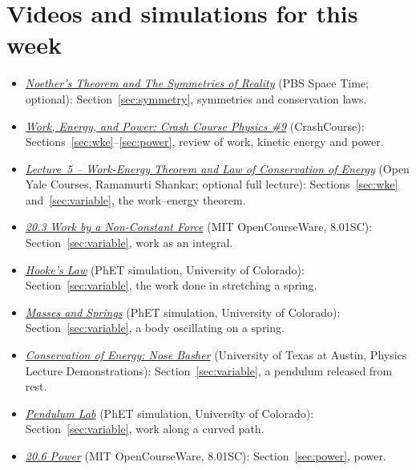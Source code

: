 \documentclass[11pt,a4paper]{article}
\begin{document}
\section*{Videos and simulations for this week}
\begin{itemize}[nosep]
\item \href{https://www.pbs.org/video/noethers-theorem-and-the-symmetries-of-reality-tf9sqz}{\emph{Noether's
  Theorem and The Symmetries of Reality}} (PBS Space Time; optional): Section~\ref{sec:symmetry},
  symmetries and conservation laws.
\item \href{https://www.youtube.com/watch?v=w4QFJb9a8vo}{\emph{Work, Energy, and Power: Crash
  Course Physics \#9}} (CrashCourse): Sections~\ref{sec:wke}--\ref{sec:power}, review of work,
  kinetic energy and power.
\item \href{https://oyc.yale.edu/node/1555}{\emph{Lecture~5 -- Work-Energy Theorem and Law of
  Conservation of Energy}} (Open Yale Courses, Ramamurti Shankar; optional full lecture):
  Sections~\ref{sec:wke} and~\ref{sec:variable}, the work--energy theorem.
\item \href{https://ocw.mit.edu/courses/8-01sc-classical-mechanics-fall-2016/pages/week-7-kinetic-energy-and-work/20-3-work-by-a-non-constant-force/}{\emph{20.3
  Work by a Non-Constant Force}} (MIT OpenCourseWare, 8.01SC): Section~\ref{sec:variable}, work as
  an integral.
\item \href{https://phet.colorado.edu/en/simulations/hookes-law}{\emph{Hooke's Law}} (PhET
  simulation, University of Colorado): Section~\ref{sec:variable}, the work done in stretching a
  spring.
\item \href{https://phet.colorado.edu/en/simulations/masses-and-springs}{\emph{Masses and Springs}}
  (PhET simulation, University of Colorado): Section~\ref{sec:variable}, a body oscillating on a
  spring.
\item \href{https://lecturedemos.ph.utexas.edu/demo/47}{\emph{Conservation of Energy: Nose
  Basher}} (University of Texas at Austin, Physics Lecture Demonstrations):
  Section~\ref{sec:variable}, a pendulum released from rest.
\item \href{https://phet.colorado.edu/en/simulations/pendulum-lab}{\emph{Pendulum Lab}} (PhET
  simulation, University of Colorado): Section~\ref{sec:variable}, work along a curved path.
\item \href{https://ocw.mit.edu/courses/8-01sc-classical-mechanics-fall-2016/pages/week-7-kinetic-energy-and-work/20-6-power/}{\emph{20.6
  Power}} (MIT OpenCourseWare, 8.01SC): Section~\ref{sec:power}, power.
\end{itemize}
\end{document}
